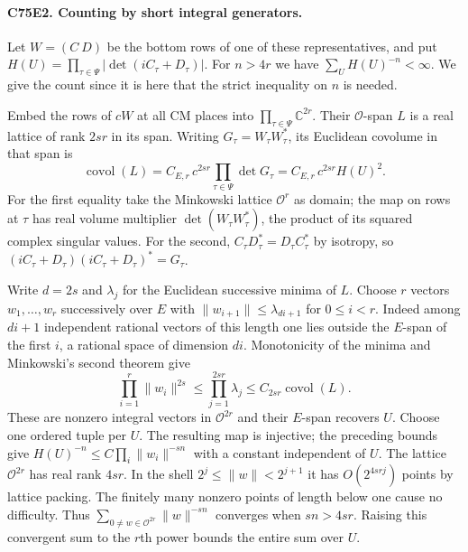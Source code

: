 \paragraph{C75E2. Counting by short integral generators.}
Let $W=(C\ D)$ be the bottom rows of one of these representatives,
and put $H(U)=\prod_{\tau\in\Psi}|\det(iC_\tau+D_\tau)|$. For
$n>4r$ we have $\sum_U H(U)^{-n}<\infty$. We give the count since
it is here that the strict inequality on $n$ is needed.

Embed the rows of $cW$ at all CM places into
$\prod_{\tau\in\Psi}\mathbb C^{2r}$. Their $\mathcal O$-span $L$
is a real lattice of rank $2sr$ in its span. Writing $G_\tau=
W_\tau W_\tau^*$, its Euclidean covolume in that span is
\[
 \operatorname{covol}(L)=C_{E,r}\,c^{2sr}
      \prod_{\tau\in\Psi}\det G_\tau
   = C_{E,r}\,c^{2sr}H(U)^2.
\]
For the first equality take the Minkowski lattice $\mathcal O^r$ as
domain; the map on rows at $\tau$ has real volume multiplier
$\det(W_\tau W_\tau^*)$, the product of its squared complex singular
values. For the second, $C_\tau D_\tau^*=D_\tau C_\tau^*$ by isotropy,
so $(iC_\tau+D_\tau)(iC_\tau+D_\tau)^*=G_\tau$.

Write $d=2s$ and $\lambda_j$ for the Euclidean successive minima of
$L$. Choose $r$ vectors $w_1,\ldots,w_r$ successively over $E$ with
$\|w_{i+1}\|\le\lambda_{di+1}$ for $0\le i<r$. Indeed among
$di+1$ independent rational vectors of this length one lies outside
the $E$-span of the first $i$, a rational space of dimension $di$.
Monotonicity of the minima and Minkowski's second theorem give
\[
 \prod_{i=1}^r\|w_i\|^{2s}
 \le\prod_{j=1}^{2sr}\lambda_j
 \le C_{2sr}\operatorname{covol}(L) .
\]
These are nonzero integral vectors in $\mathcal O^{2r}$ and their
$E$-span recovers $U$. Choose one ordered tuple per $U$. The resulting
map is injective; the preceding bounds give
$H(U)^{-n}\le C\prod_i\|w_i\|^{-sn}$ with a constant independent
of $U$. The lattice $\mathcal O^{2r}$ has real rank $4sr$. In the
shell $2^j\le\|w\|<2^{j+1}$ it has $O(2^{4srj})$ points by lattice
packing. The finitely many nonzero points of length below one cause
no difficulty. Thus $\sum_{0\ne w\in\mathcal O^{2r}}\|w\|^{-sn}$
converges when $sn>4sr$. Raising this convergent sum to the $r$th
power bounds the entire sum over $U$.

